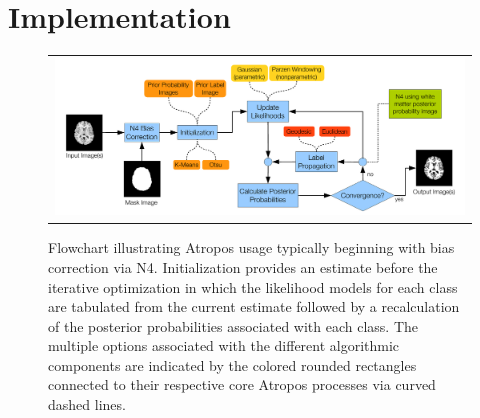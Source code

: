\documentclass[11pt,english]{article}
\begin{document}


\section{Implementation} 

\begin{figure}
\begin{center}
\begin{tabular}{c}
\includegraphics[width=160mm]{AtroposFlowchart.pdf}
\end{tabular}
\caption{\baselineskip 12pt \small Flowchart illustrating Atropos usage typically beginning with bias correction via N4.  
Initialization provides an estimate before the iterative optimization in which the 
likelihood models for each class are tabulated from the current estimate followed by a recalculation of the 
posterior probabilities associated with each class.  The multiple options associated with the different algorithmic 
components are indicated by the colored rounded rectangles connected to their respective core Atropos 
processes via curved dashed lines.  }
\label{fig:flowchart}
\end{center}
\end{figure}
\end{document}
